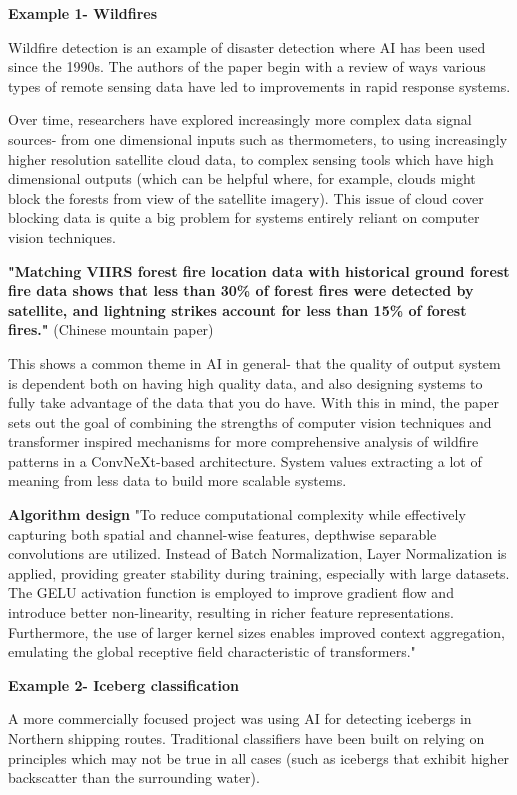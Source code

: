 \documentclass[conference,a4paper]{IEEEtran}
\begin{document}
\textbf{Example 1- Wildfires}

Wildfire detection is an example of disaster detection where AI has been used since the 1990s. The authors of the paper begin with a review of ways various types of remote sensing data have led to improvements in rapid response systems. 

Over time, researchers have explored increasingly more complex data signal sources- from one dimensional inputs such as thermometers, to using increasingly higher resolution satellite cloud data, to complex sensing tools which have high dimensional outputs (which can be helpful where, for example, clouds might block the forests from view of the satellite imagery). This issue of cloud cover blocking data is quite a big problem for systems entirely reliant on computer vision techniques. 

\textbf{"Matching VIIRS forest fire location data with historical ground forest fire data shows that less than 30\% of forest fires were detected by satellite, and lightning strikes account for less than 15\% of forest fires."}
(Chinese mountain paper)

This shows a common theme in AI in general- that the quality of output system is dependent both on having high quality data, and also  designing systems to fully take advantage of the data that you do have. With this in mind, the paper sets out the goal of combining the strengths of computer vision techniques and transformer inspired mechanisms for more comprehensive analysis of wildfire patterns in a ConvNeXt-based architecture. System values extracting a lot of meaning from less data to build more scalable systems.

\textbf{Algorithm design}
"To reduce computational complexity while effectively capturing both spatial and channel-wise features, depthwise separable convolutions are utilized. Instead of Batch Normalization, Layer Normalization is applied, providing greater stability during training, especially with large datasets. The GELU activation function is employed to improve gradient flow and introduce better non-linearity, resulting in richer feature representations. Furthermore, the use of larger kernel sizes enables improved context aggregation, emulating the global receptive field characteristic of transformers."



\textbf{Example 2- Iceberg classification}

A more commercially focused project was using AI for detecting icebergs in Northern shipping routes. Traditional classifiers have been built on relying on principles which may not be true in all cases (such as icebergs that exhibit higher backscatter than the surrounding water). 
\end{document}

